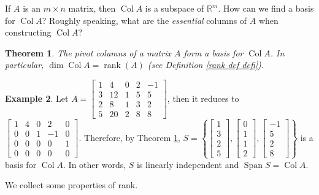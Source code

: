 \documentclass[12pt,letterpaper]{book}
\numberwithin{equation}{section}
\newtheorem{thm}{\textbf{Theorem}}[section]
\theoremstyle{definition}
\newtheorem{example}[thm]{\textbf{Example}}
\newcommand{\Coll}{\operatorname{Col}}
\newcommand{\Span}{\operatorname{Span}}
\newcommand{\rank}{\operatorname{rank}}
\begin{document}
If $A$ is an $m\times n$ matrix, then $\Coll A$ is a subspace of $\mathbb{R}^m$. How can we find a basis for $\Coll
A$? Roughly speaking, what are the \textit{essential} columns of $A$ when constructing $\Coll A$?

\begin{thm}\label{pivotbasis} The pivot columns of a matrix $A$ form a basis
for $\Coll A$. In particular, $\dim \Coll A=\rank(A)$ (see Definition \ref{rank def defi}).
\end{thm}

\begin{example}\label{nulcolmat} Let $A=\left[\begin{array}{rrrrr} 1 & 4 & 0 & 2 & -1
\\ 3 & 12 & 1 & 5 & 5 \\ 2 & 8 & 1 & 3 & 2 \\ 5 & 20 & 2 & 8 & 8
\end{array}\right]$, then it reduces to
$\left[\begin{array}{rrrrr} 1 & 4 & 0 & 2 & 0 \\ 0 & 0 & 1 & -1 & 0
\\ 0 & 0 & 0 & 0 & 1 \\ 0 & 0 & 0 & 0 & 0
\end{array}\right]$. Therefore, by Theorem \ref{pivotbasis}, $S=\left\{\left[\begin{array}{r} 1 \\ 3 \\
2 \\ 5 \end{array}\right],\left[\begin{array}{r} 0 \\ 1 \\
1 \\ 2 \end{array}\right],\left[\begin{array}{r} -1 \\ 5 \\
2 \\ 8 \end{array}\right]\right\}$ is a basis for $\Coll A$. In
other words, $S$ is linearly independent and $\Span S=\Coll
A$.
\end{example}

We collect some properties of rank.
\end{document}
